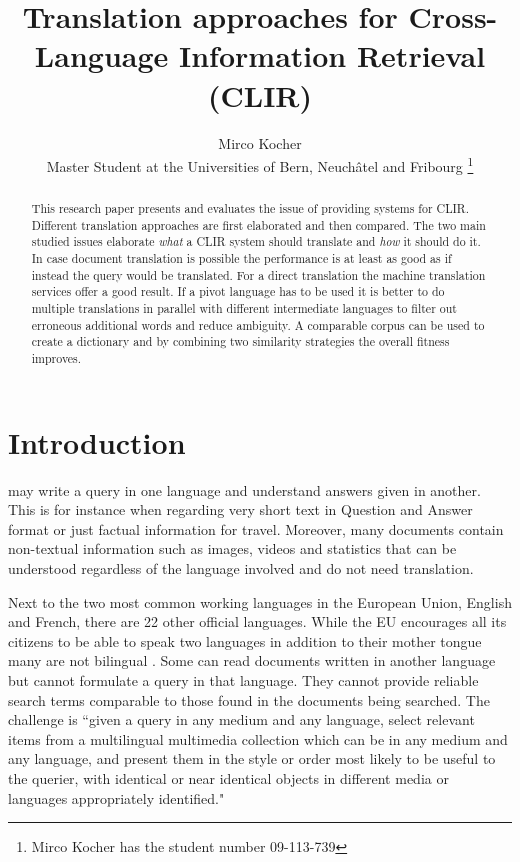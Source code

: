 \documentclass[journal]{IEEEtran}
\begin{document}
\title{Translation approaches for Cross-Language Information Retrieval (CLIR)}

\author{Mirco Kocher\\
Master Student at the Universities of Bern, Neuch\^{a}tel and Fribourg
\thanks{Mirco Kocher has the student number 09-113-739} %
}


\maketitle



\begin{abstract}
This research paper presents and evaluates the issue of providing systems for CLIR.
Different translation approaches are first elaborated and then compared.
The two main studied issues elaborate \textit{what} a CLIR system should translate and \textit{how} it should do it.
In case document translation is possible the performance is at least as good as if instead the query would be translated.
For a direct translation the machine translation services offer a good result.
If a pivot language has to be used it is better to do multiple translations in parallel with different intermediate languages to filter out erroneous additional words and reduce ambiguity.
A comparable corpus can be used to create a dictionary and by combining two similarity strategies the overall fitness improves.
\end{abstract}



\section{Introduction}
 may write a query in one language and understand answers given in another.
This is for instance when regarding very short text in Question and Answer format or just factual information for travel.
Moreover, many documents contain non-textual information such as images, videos and statistics that can be understood regardless of the language involved and do not need translation.

Next to the two most common working languages in the European Union, English and French, there are 22 other official languages.
While the EU encourages all its citizens to be able to speak two languages in addition to their mother tongue many are not bilingual \cite{ebs386}.
Some can read documents written in another language but cannot formulate a query in that language.
They cannot provide reliable search terms comparable to those found in the documents being searched.
The challenge is ``given a query in any medium and any language, select relevant items from a multilingual multimedia collection which can be in any medium and any language, and present them in the style or order most likely to be useful to the querier, with identical or near identical objects in different media or languages appropriately identified." \cite{oard97a}
\end{document}
